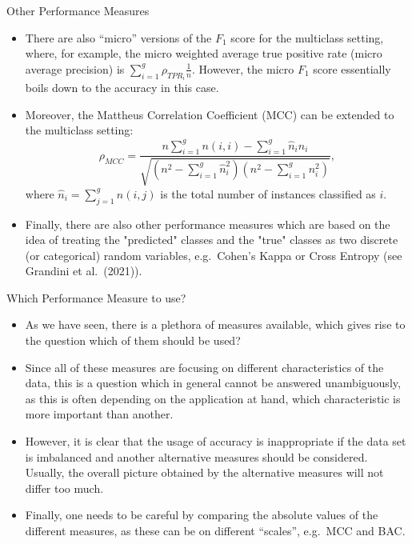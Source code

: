 \documentclass[11pt,compress,t,notes=noshow, xcolor=table]{beamer}
\begin{document}
\begin{vbframe}{Other Performance Measures}
	\footnotesize{
		\begin{itemize}
%			
			\item There are also ``micro'' versions of the $F_1$ score for the multiclass setting, where, for example, the micro weighted average true positive rate (micro average precision) is $\sum_{i=1}^g  \rho_{TPR_i} \frac{1}{n}.$ However, the micro $F_1$ score essentially boils down to the accuracy in this case.
%			
			\item Moreover, the Mattheus Correlation Coefficient (MCC) can be extended to the multiclass setting:
%			
			$$   \rho_{MCC} = \frac{ n  \sum_{i=1}^g n(i,i) -  \sum_{i=1}^g \hat n_i n_i}{\sqrt{ (n^2 - \sum_{i=1}^g \hat n_i^2)(n^2 - \sum_{i=1}^g n_i^2)  }},$$
%			
			where $\hat n_i = \sum_{j=1}^g n(i,j)$ is the total number of instances classified as $i.$
%			
			\item Finally, there are also other performance measures which are based on the idea of treating the "predicted" classes and the "true" classes as two discrete (or categorical) random variables, e.g.\ Cohen's Kappa or Cross Entropy (see Grandini et al.\ (2021)).
%			 
%			
		\end{itemize}
	}
\end{vbframe}


\begin{vbframe}{Which Performance Measure to use?}
	\small{
		\begin{itemize}
			\item As we have seen, there is a plethora of measures available, which gives rise to the question which of them should be used?	
			\item  Since all of these measures are focusing on different characteristics of the data, this is a question which in general cannot be answered unambiguously, as this is often depending on the application at hand, which characteristic is more important than another.
			\item However, it is clear that the usage of accuracy is inappropriate if the data set is imbalanced and another alternative measures should be considered. Usually, the overall picture obtained by the alternative measures will not differ too much.
			\item Finally, one needs to be careful by comparing the absolute values of the different measures, as these can be on different ``scales'', e.g.\ MCC and BAC. 
		\end{itemize}
	}
\end{vbframe}



%
\endlecture
\end{document}
